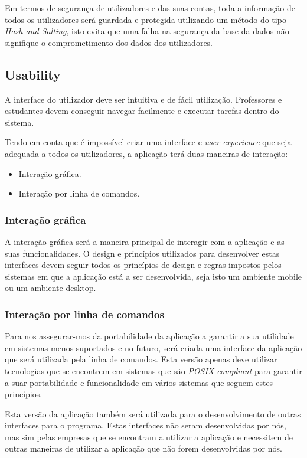 \documentclass[10pt]{article}
\begin{document}
Em termos de segurança de utilizadores e das suas contas, toda a informação de todos os utilizadores será
guardada e protegida utilizando um método do tipo \textit{Hash and Salting}, isto evita que uma falha na
segurança da base da dados não signifique o comprometimento dos dados dos utilizadores.

\subsection{Usability}
A interface do utilizador deve ser intuitiva e de fácil utilização.
Professores e estudantes devem conseguir navegar facilmente e executar tarefas dentro do sistema.

Tendo em conta que é impossível criar uma interface e \textit{user experience} que seja adequada a todos os
utilizadores, a aplicação terá duas maneiras de interação:
\begin{itemize}
    \item Interação gráfica.
    \item Interação por linha de comandos.
\end{itemize}

\subsubsection{Interação gráfica}
A interação gráfica será a maneira principal de interagir com a aplicação e as suas funcionalidades. O design e princípios
utilizados para desenvolver estas interfaces devem seguir todos os princípios de design e regras impostos pelos sistemas
em que a aplicação está a ser desenvolvida, seja isto um ambiente mobile ou um ambiente desktop.

\subsubsection{Interação por linha de comandos}
Para nos assegurar-mos da portabilidade da aplicação a garantir a sua utilidade em sistemas menos suportados e no futuro,
será criada uma interface da aplicação que será utilizada pela linha de comandos.
Esta versão apenas deve utilizar tecnologias que se encontrem em sistemas que são \textit{POSIX compliant} para
garantir a suar portabilidade e funcionalidade em vários sistemas que seguem estes princípios.

Esta versão da aplicação também será utilizada para o desenvolvimento de outras interfaces para o programa. Estas
interfaces não seram desenvolvidas por nós, mas sim pelas empresas que se encontram a utilizar a aplicação e
necessitem de outras maneiras de utilizar a aplicação que não forem desenvolvidas por nós.
\end{document}
